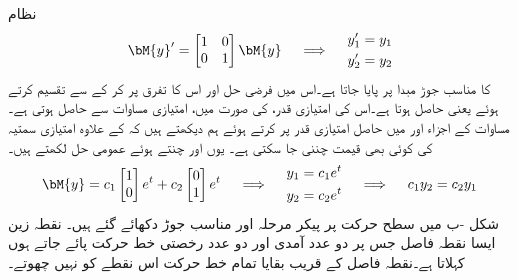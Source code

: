 نظام 
\begin{gather}\label{مساوات_نظام_مناسب_جوڑ}
\begin{aligned}
\bM{y}'=\begin{bmatrix} 1 & 0 \\ 0 &1 \end{bmatrix} \bM{y}
\end{aligned}\quad \implies \quad 
\begin{aligned} 
y_1'&=y_1\\
y_2'&=y_2
\end{aligned}
\end{gather}
کا مناسب جوڑ مبدا پر پایا جاتا ہے۔اس میں فرضی حل  اور اس کا تفرق  پر کر کے  سے تقسیم کرتے ہوئے   یعنی  حاصل ہوتا ہے۔اس کی امتیازی قدر،  کی صورت میں، امتیازی مساوات  سے    حاصل ہوتی ہے۔مساوات  کے اجزاء   اور  میں حاصل امتیازی قدر پر کرتے ہوئے ہم دیکھتے ہیں کہ  کے علاوہ امتیازی سمتیہ  کی کوئی بھی قیمت چننی جا سکتی ہے۔ یوں  اور  چنتے ہوئے عمومی حل لکھتے ہیں۔
\begin{gather*}
\begin{aligned}
\bM{y}=c_1\begin{bmatrix}1 \\ 0  \end{bmatrix} e^{t} +c_2\begin{bmatrix} 0 \\ 1 \end{bmatrix} e^{t}
\end{aligned}\quad \implies \quad
\begin{aligned}
y_1&=c_1e^t\\
y_2&=c_2e^t
\end{aligned} \quad \implies \quad
\begin{aligned}
c_1y_2=c_2y_1
\end{aligned}
\end{gather*} 
شکل -ب میں سطح حرکت پر پیکر مرحلہ اور مناسب جوڑ دکھائے گئے ہیں۔ 
\quad نقطہ زین\\
ایسا نقطہ فاصل  جس پر دو عدد آمدی اور دو عدد رخصتی خط حرکت پائے جاتے ہوں   کہلاتا ہے۔نقطہ فاصل کے قریب بقایا تمام خط حرکت اس نقطے کو نہیں چھوتے۔

